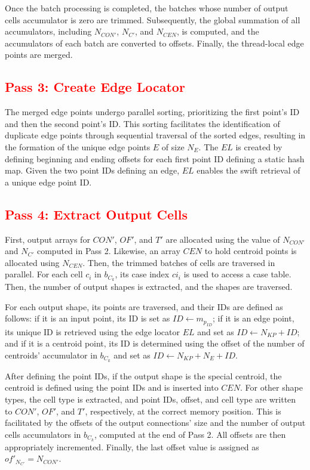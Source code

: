 \documentclass{egpubl}
\newcommand*{\fix}[1]{\textcolor{red}{#1}}
\begin{document}
Once the batch processing is completed, the batches whose number of output cells accumulator is zero are trimmed. Subsequently, the global summation of all accumulators, including $N_{CON'}$, $N_{C'}$, and $N_{CEN}$, is computed, and the accumulators of each batch are converted to offsets. Finally, the thread-local edge points are merged.

\subsection{\fix{Pass 3: Create Edge Locator}}

The merged edge points undergo parallel sorting, prioritizing the first point's ID and then the second point's ID. This sorting facilitates the identification of duplicate edge points through sequential traversal of the sorted edges, resulting in the formation of the unique edge points $E$ of size $N_E$. The $EL$ is created by defining beginning and ending offsets for each first point ID defining a static hash map. Given the two point IDs defining an edge, $EL$  enables the swift retrieval of a unique edge point ID.

\subsection{\fix{Pass 4: Extract Output Cells}}

First, output arrays for $CON'$, $OF'$, and $T'$ are allocated using the value of $N_{CON'}$ and $N_{C'}$ computed in Pass 2. Likewise, an array $CEN$ to hold centroid points is allocated using $N_{CEN}$. Then, the trimmed batches of cells are traversed in parallel. For each cell $c_i$ in $b_{C_k}$, its case index $ci_i$ is used to access a case table. Then, the number of output shapes is extracted, and the shapes are traversed.

For each output shape, its points are traversed, and their IDs are defined as follows: if it is an input point, its ID is set as $ID \gets m_{p_{ID}}$; if it is an edge point, its unique ID is retrieved using the edge locator $EL$ and set as $ID \gets N_{KP} + ID$; and if it is a centroid point, its ID is determined using the offset of the number of centroids' accumulator in $b_{C_k}$ and set as $ID \gets N_{KP} + N_E + ID$.

After defining the point IDs, if the output shape is the special centroid, the centroid is defined using the point IDs and is inserted into $CEN$. For other shape types, the cell type is extracted, and point IDs, offset, and cell type are written to $CON'$, $OF'$, and $T'$, respectively, at the correct memory position. This is facilitated by the offsets of the output connections' size and the number of output cells accumulators in $b_{C_k}$, computed at the end of Pass 2. All offsets are then appropriately incremented. Finally, the last offset value is assigned as $of'_{N_{C'}} =N_{CON'}$.
\end{document}
